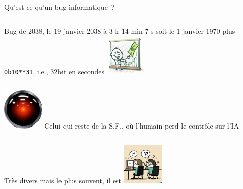 \documentclass{beamer}
\begin{document}
    \begin{frame}{Qu'est-ce qu'un bug informatique~?}
        \begin{columns}
            Bug de 2038, le 19 janvier 2038 à 3 h 14 min 7 s soit le 1 janvier 1970 plus \lstinline{0b10**31}, i.e., 32bit en secondes
            \centering
            \includegraphics[width=2cm]{image/bug-business}
        \end{columns}
        \begin{columns}
            \centering
            \includegraphics[width=2cm]{image/hall-eye}
            Celui qui reste de la S.F., où l'humain perd le contrôle sur l'IA
        \end{columns}
        \begin{columns}
            Très divers mais le plus souvent, il est 
            \centering
            \includegraphics[width=2cm]{image/working-together}
        \end{columns}

    \end{frame}
\end{document}
